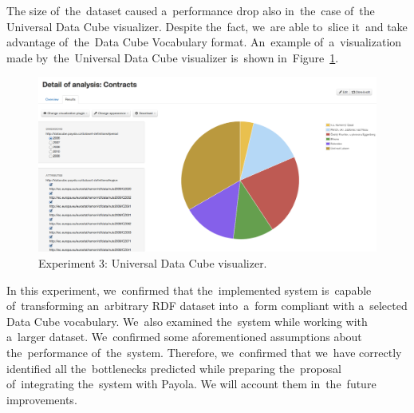 The size of~the~dataset caused a~performance drop also in~the~case of~the
Universal Data Cube visualizer. Despite the~fact, we~are able to~slice it~and 
take advantage of~the~Data Cube Vocabulary format. An~example of~a~visualization 
made by~the~Universal Data Cube visualizer is~shown in~Figure~\ref{fig:contracts-uni-dcv}.

\begin{figure}
  \centering
  \includegraphics[width=140mm]{img/contracts-uni-dcv.png}
  \caption{Experiment 3: Universal Data Cube visualizer.}
  \label{fig:contracts-uni-dcv}
\end{figure}

In this experiment, we~confirmed that the~implemented system is~capable of~transforming an~arbitrary RDF dataset into~a~form compliant with a~selected Data 
Cube vocabulary. We~also examined the~system while working with a~larger 
dataset. We~confirmed some aforementioned assumptions about the~performance of~the~system. Therefore, we~confirmed that we~have correctly identified all the~bottlenecks predicted while preparing the~proposal of~integrating the~system with Payola. 
We will account them in~the~future improvements.

